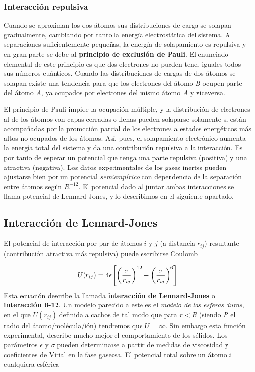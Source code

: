 \subsubsection{Interacción repulsiva}

Cuando se aproximan los dos átomos sus distribuciones de carga se solapan gradualmente, cambiando por tanto la energía electrostática del sistema. A separaciones suficientemente pequeñas, la energía de solapamiento es repulsiva y en gran parte se debe al \textbf{principio de exclusión de Pauli}. El enunciado elemental de este principio es que dos electrones no pueden tener iguales todos sus números cuánticos. Cuando las distribuciones de cargas de dos átomos se solapan existe una tendencia para que los electrones del átomo $B$ ocupen parte del átomo $A$, ya ocupados por electrones del mismo átomo $A$ y viceversa. 

El principio de Pauli impide la ocupación múltiple, y la distribución de electrones al de los átomos con capas cerradas o llenas pueden solaparse solamente si están acompañadas por la promoción parcial de los electrones a estados energéticos más altos no ocupados de los átomos. Así, pues, el solapamiento electrónico aumenta la energía total del sistema y da una contribución repulsiva a la interacción. Es por tanto de esperar un potencial que tenga una parte repulsiva (positiva) y una atractiva (negativa). Los datos experimentales de los gases inertes pueden ajustarse bien por un potencial \textit{semiempírico} con dependencia de la separación entre átomos según $R^{-12}$. El potencial dado al juntar ambas interacciones se llama potencial de Lennard-Jones, y lo describimos en el siguiente apartado.

\subsection{Interacción de Lennard-Jones}


El potencial de interacción por par de átomos $i$ y $j$ (a distancia $r_{ij}$) resultante (contribución atractiva más repulsiva) puede escribirse Coulomb

\begin{equation}
    U (r_{ij}) = 4 \epsilon \left[ \left( \frac{\sigma}{r_{ij}} \right)^{12}-\left( \frac{\sigma}{r_{ij}} \right)^6 \right]
\end{equation}
Esta ecuación describe la llamada \textbf{interacción de Lennard-Jones} o  \textbf{interacción 6-12}. Un modelo parecido a este es el \textit{modelo de las esferas duras}, en el que $U(r_{ij})$ definida a cachos de tal modo que para $r<R$ (siendo $R$ el radio del átomo/molécula/ión) tendremos que $U = \infty$. Sin embargo esta función experimental, describe mucho mejor el comportamiento de los sólidos. Los parámetros $\epsilon$ y $\sigma$ pueden determinarse a partir de medidas de viscosidad y coeficientes de Virial en la fase gaseosa. El potencial total sobre un átomo $i$ cualquiera esférica

